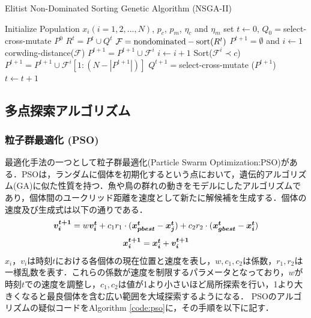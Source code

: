 \documentclass[a4j,11pt]{jarticle}
\begin{document}
\begin{algorithm}[H]
\caption{Elitist Non-Dominated Sorting Genetic Algorithm (NSGA-II)}
\label{code:nsga}
\begin{algorithmic}[3]
\REQUIRE Initialize Population $x_i (i=1, 2,..., N)$, $p_c$, $p_m$, $\eta_c$ and $\eta_m$
\STATE set $t \leftarrow 0$, $Q_0=$select-cross-mutate $P^0$
\STATE $R^t=P^t \cup Q^t$
\STATE $\mathcal{F} = {\rm nondominated-sort}(R^t)$
\STATE $P^{t+1}=\emptyset$ and $i \leftarrow 1$
\STATE corwding-distance($\mathcal{F}$)
\STATE $P^{t+1}=P^{t+1} \cup \mathcal{F}^i$
\STATE $i \leftarrow i+1$
\ENDWHILE
\STATE Sort($\mathcal{F}^i \prec c$)
\STATE $P^{t+1}=P^{t+1} \cup \mathcal{F}^i[1:(N-|P^{t+1}|)]$
\STATE $Q^{t+1}=$select-cross-mutate ($P^{t+1}$)
\STATE $t \leftarrow t+1$
\ENDWHILE 
\end{algorithmic}
\end{algorithm}

\subsection{多点探索アルゴリズム}
\label{ss:swarm}

\subsubsection{粒子群最適化 (PSO)}
\label{sss:PSO}

  \makeatletter
    \renewcommand{\theequation}{%
    \thesection.\arabic{equation}}
  \makeatother
  \makeatletter
    \renewcommand{\thefigure}{%
    \thesection.\arabic{figure}}
  \makeatother

最適化手法の一つとして粒子群最適化(Particle Swarm Optimization:PSO)がある．PSOは，ランダムに個体を初期化するという点において，遺伝的アルゴリズム(GA)に似た性質を持つ．魚や鳥の群れの動きをモデルにしたアルゴリズムであり，個体間のユークリッド距離を速度として新たに解候補を生成する．個体の速度及び生成式は以下の通りである．
\begin{equation}
\label{eq:pso-vi}
\mbox{\boldmath $v_i^{t+1}$}=w\mbox{\boldmath $v_i^t$}+c_1r_1 \cdot (\mbox{\boldmath $x_{pbest}^t$}-\mbox{\boldmath $x_j^t$})+c_2r_2 \cdot (\mbox{\boldmath $x_{gbest}^t$}-\mbox{\boldmath $x_i^t$})
\end{equation}
\begin{equation}
\label{eq:pso-xi}
\mbox{\boldmath $x_i^{t+1}$}=\mbox{\boldmath $x_i^t$}+\mbox{\boldmath $v_i^{t+1}$}
\end{equation}
$x_i$，$v_i$は時刻$t$における各個体の現在位置と速度を表し，$w,c_1,c_2$は係数，$r_1, r_2$は一様乱数を表す．これらの係数が速度を制限するパラメータとなっており，$w$が時刻$t$での速度を調整し，$c_1,c_2$は値が1より小さいほど局所探索を行い，1より大きくなると最良個体を含む広い範囲を大域探索するようになる．
PSOのアルゴリズムの疑似コードをAlgorithm \ref{code:pso}に，その手順を以下に記す．
\end{document}
